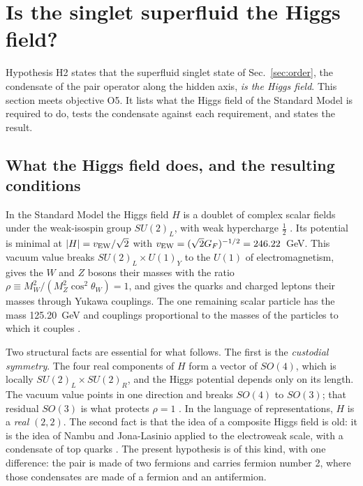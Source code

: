 
\section{Is the singlet superfluid the Higgs field?}
\label{sec:higgs}

Hypothesis H2 states that the superfluid singlet state of Sec.~\ref{sec:order}, the condensate of
the pair operator along the hidden axis, \emph{is the Higgs field}. This section meets objective O5.
It lists what the Higgs field of the Standard Model is required to do, tests the condensate against
each requirement, and states the result.

\subsection{What the Higgs field does, and the resulting conditions}

In the Standard Model the Higgs field $H$ is a doublet of complex scalar fields under the
weak-isospin group $SU(2)_L$, with weak hypercharge $\tfrac12$
\cite{Higgs1964,EnglertBrout1964,Weinberg1967}. Its potential is minimal at
$|H|=v_{\rm EW}/\sqrt2$ with $v_{\rm EW}=(\sqrt2G_F)^{-1/2}=246.22$~GeV. This vacuum value breaks
$SU(2)_L\times U(1)_Y$ to the $U(1)$ of electromagnetism, gives the $W$ and $Z$ bosons their masses
with the ratio $\rho\equiv M_W^2/(M_Z^2\cos^2\theta_W)=1$, and gives the quarks and charged leptons
their masses through Yukawa couplings. The one remaining scalar particle has the mass 125.20~GeV and
couplings proportional to the masses of the particles to which it couples \cite{PDG2024}.

Two structural facts are essential for what follows. The first is the \emph{custodial symmetry}. The
four real components of $H$ form a vector of $SO(4)$, which is locally $SU(2)_L\times SU(2)_R$, and
the Higgs potential depends only on its length. The vacuum value points in one direction and breaks
$SO(4)$ to $SO(3)$; that residual $SO(3)$ is what protects $\rho=1$ \cite{Sikivie1980}. In the
language of representations, $H$ is a \emph{real} $(2,2)$. The second fact is that the idea of a
composite Higgs field is old: it is the idea of Nambu and Jona-Lasinio \cite{NJL1961} applied to the
electroweak scale, with a condensate of top quarks \cite{BardeenHillLindner1990}. The present
hypothesis is of this kind, with one difference: the pair is made of two fermions and carries fermion
number 2, where those condensates are made of a fermion and an antifermion.

